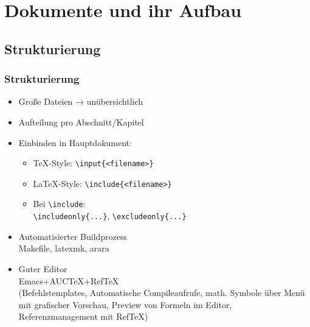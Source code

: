 \section{Dokumente und ihr Aufbau}

\subsection{Strukturierung}
\begin{frame}
  \frametitle{Strukturierung}
  \begin{itemize}
  \item Große Dateien → unübersichtlich
  \item Aufteilung pro Abschnitt/Kapitel
  \item Einbinden in Hauptdokument:
    \begin{itemize}
    \item \TeX-Style: \texttt{\textbackslash input\{<filename>\}}
    \item \LaTeX-Style: \texttt{\textbackslash include\{<filename>\}}
    \item Bei \texttt{\textbackslash include}:\\
      \texttt{\textbackslash includeonly\{...\}},
      \texttt{\textbackslash excludeonly\{...\}}
    \end{itemize}
  \item Automatisierter Buildprozess\\
    Makefile, latexmk, arara
  \item Guter Editor\\\pause
    Emacs+AUC\TeX+Ref\TeX\\
    (Befehlstemplates, Automatische Compileaufrufe, math. Symbole über
    Menü mit grafischer Vorschau, Preview von Formeln im Editor,
    Referenzmanagement mit Ref\TeX)
  \end{itemize}
\end{frame}

